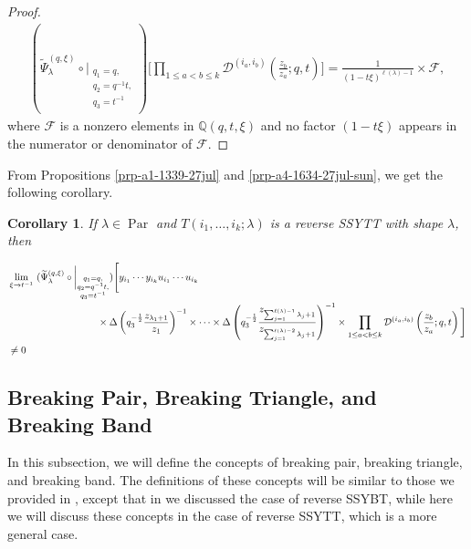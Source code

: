 \documentclass[12pt,reqno,a4paper]{amsart}
\newcommand{\comp}{\circ}
\newcommand{\cals}[1]{\mathcal{#1}}
\newcommand{\bb}[1]{\mathbb{#1}}
\numberwithin{equation}{section}
\newtheorem{cor}[thm]{Corollary}
\newcommand{\dualmap}{
\widetilde{\Psi}^{(q,\xi)}_{\lambda}
}
\theoremstyle{definition}
\begin{document}
\begin{proof}
\begin{align}
	(
	\dualmap
	\comp 
	\bigg|_{
		\substack{
			q_1 = q, \\
			q_2 = q^{-1}t,\\
			q_3 = t^{-1} \\
		}
	}
	)
	\Bigg[
	\prod_{1 \leq a < b \leq k}			
	\cals{D}^{(i_a,i_b)}\left(
	\frac{z_b}{z_a}
	; q, t
	\right)
	\Bigg]
	=
	\frac{1}{(1 - t\xi)^{\ell(\lambda)-1}} \times \cals{F}, 
\end{align}
where $\cals{F}$ is a nonzero elements in $\bb{Q}(q,t,\xi)$ and no factor $(1 - t\xi)$ appears in the numerator or denominator of $\cals{F}$. 
\end{proof}

From Propositions \ref{prp-a1-1339-27jul} and \ref{prp-a4-1634-27jul-sun}, we get the following corollary. 

\begin{cor}
If $\lambda \in \operatorname{Par}$  and $T(i_1,\dots,i_k;\lambda)$ is a reverse SSYTT with shape $\lambda$, then 

\footnotesize
\begin{align}
	&\lim_{\xi \rightarrow t^{-1}}\,\,
	(
	\dualmap
	\comp 
	\bigg|_{
		\substack{
			q_1 = q, \\
			q_2 = q^{-1}t,\\
			q_3 = t^{-1} \\
		}
	}
	)
	\Bigg[
	y_{i_1}\cdots y_{i_k}
	u_{i_1}\cdots u_{i_k}
	\\
	&\hspace{3.2cm}\times
	\Delta\left(	q_3^{-\frac{1}{2}}\frac{z_{\lambda_1 + 1}}{z_1}				\right)^{-1}
	\times 
	\cdots 
	\times 
	\Delta\left(	q_3^{-\frac{1}{2}}\frac{z_{\sum_{j = 1}^{\ell(\lambda) - 1}\lambda_j+1}}{z_{\sum_{j = 1}^{\ell(\lambda) - 2}\lambda_j+1}}				\right)^{-1}
	\times
	\prod_{1 \leq a < b \leq k}
	\cals{D}^{(i_a,i_b)}\left(
	\frac{z_b}{z_a}
	; q, t
	\right)
	\Bigg]
	\notag 
	\\
	&\neq 0 
	\notag 
\end{align}
\normalsize
\end{cor}

\subsection{Breaking Pair, Breaking Triangle, and Breaking Band}

In this subsection, we will define the concepts of breaking pair, breaking triangle, and breaking band. The definitions of these concepts will be similar to those we provided in \cite{CSW2025}, except that in \cite{CSW2025} we discussed the case of reverse SSYBT, while here we will discuss these concepts in the case of reverse SSYTT, which is a more general case. 
\end{document}
